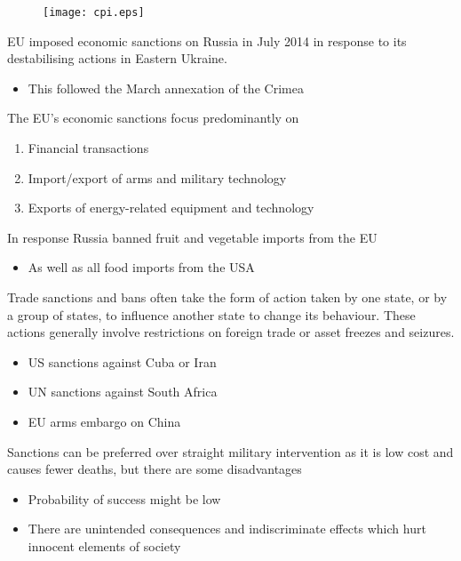 \documentclass{beamer}
\begin{document}
\begin{frame}
  \begin{figure}
    \texttt{[image: cpi.eps]}
  \end{figure}
\end{frame}

\begin{frame}
  EU imposed economic sanctions on Russia in July 2014 in response to its destabilising actions in Eastern Ukraine.
  \begin{itemize}
    \item This followed the March annexation of the Crimea
  \end{itemize}
  \medskip
  The EU's economic sanctions focus predominantly on
  \begin{enumerate}
    \item Financial transactions
    \item Import/export of arms and military technology
    \item Exports of energy-related equipment and technology
  \end{enumerate}
  \medskip
  In response Russia banned fruit and vegetable imports from the EU
  \begin{itemize}
    \item As well as all food imports from the USA
  \end{itemize}
\end{frame}

\begin{frame}
  Trade sanctions and bans often take the form of action taken by one state, or by a group of states, to influence another state to change its behaviour.
  These actions generally involve restrictions on foreign trade or asset freezes and seizures. 
  \begin{itemize}
    \item US sanctions against Cuba or Iran
    \item UN sanctions against South Africa
    \item EU arms embargo on China
  \end{itemize}
  \medskip
  Sanctions can be preferred over straight military intervention as it is low cost and causes fewer deaths, but there are some disadvantages
  \begin{itemize}
    \item Probability of success might be low
    \item There are unintended consequences and indiscriminate effects which hurt innocent elements of society
  \end{itemize}
\end{frame}
\end{document}

